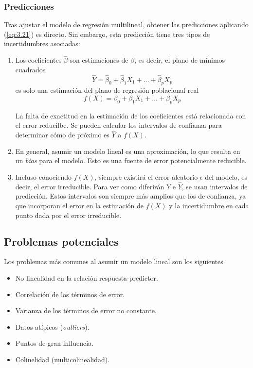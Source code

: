 \subsubsection{Predicciones}

Tras ajustar el modelo de regresión multilineal, obtener las predicciones aplicando (\ref{eq:3.21}) es directo. Sin embargo, esta predicción tiene tres tipos de incertidumbres asociadas:
\begin{enumerate}
\item Los coeficientes $\hat{\beta}$ son estimaciones de $\beta$, es decir, el plano de mínimos cuadrados 
\begin{equation}
\hat{Y} = \hat{\beta}_0 + \hat{\beta}_1 X_1 + \dots + \hat{\beta}_p X_p 
\end{equation}
es solo una estimación del plano de regresión poblacional real
\begin{equation}
f(X) = \beta_0 + \beta_1 X_1 + \dots + \beta_p X_p 
\end{equation}

La falta de exactitud en la estimación de los coeficientes está relacionada con el error reducilbe. Se pueden calcular los intervalos de confianza para determinar cómo de próximo es $\hat{Y}$ a $f(X)$.
\item En general, asumir un modelo lineal es una aproximación, lo que resulta en un \textit{bias} para el modelo. Esto es una fuente de error potencialmente reducible. 
\item Incluso conociendo $f(X)$, siempre existirá el error aleatorio $\epsilon$ del modelo, es decir, el error irreducible. Para ver como diferirán $Y$ e $\hat{Y}$, se usan intervalos de predicción. Estos intervalos son siempre más amplios que los de confianza, ya que incorporan el error en la estimación de $f(X)$ y la incertidumbre en cada punto dada por el error irreducible.
\end{enumerate}

\subsection{Problemas potenciales}

\noindent Los problemas más comunes al asumir un modelo lineal son los siguientes 
\begin{itemize}
\item No linealidad en la relación respuesta-predictor.
\item Correlación de los términos de error.
\item Varianza de los términos de error no constante.
\item Datos atípicos (\textit{outliers}).
\item Puntos de gran influencia.
\item Colinelidad (multicolinealidad).
\end{itemize}

